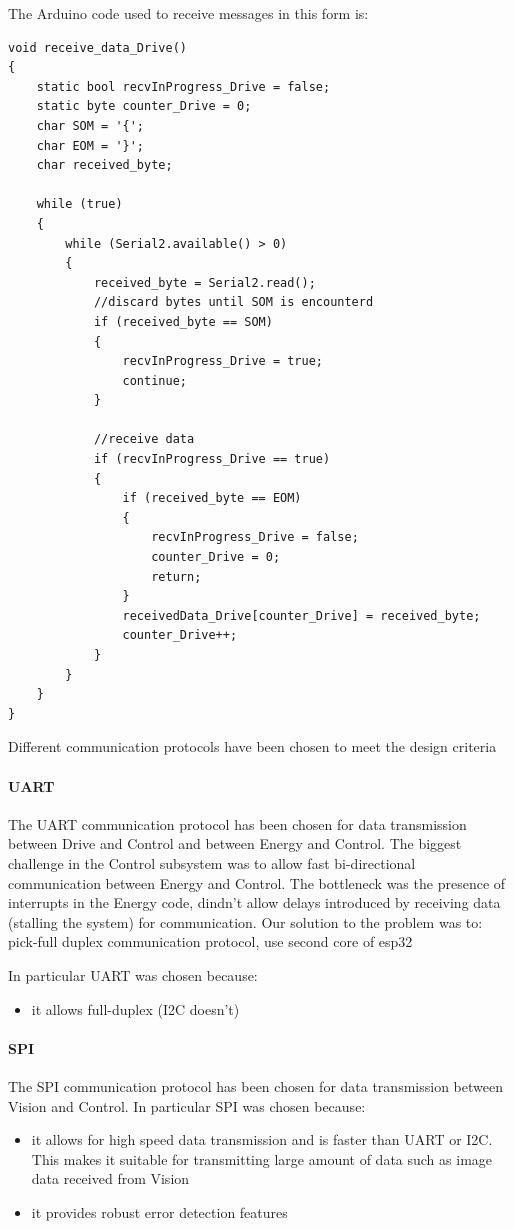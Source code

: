\documentclass[10pt,twoside]{article}
\begin{document}
The Arduino code used to receive messages in this form is:
\begin{verbatim}
void receive_data_Drive()
{
    static bool recvInProgress_Drive = false;
    static byte counter_Drive = 0;
    char SOM = '{';
    char EOM = '}';
    char received_byte;

    while (true)
    {
        while (Serial2.available() > 0)
        {
            received_byte = Serial2.read();
            //discard bytes until SOM is encounterd
            if (received_byte == SOM)
            {
                recvInProgress_Drive = true;
                continue;
            }

            //receive data
            if (recvInProgress_Drive == true)
            {
                if (received_byte == EOM)
                {
                    recvInProgress_Drive = false;
                    counter_Drive = 0;
                    return;
                }
                receivedData_Drive[counter_Drive] = received_byte;
                counter_Drive++;
            }
        }
    }
}

\end{verbatim}








Different communication protocols have been chosen to meet the design criteria

\paragraph{UART} The UART communication protocol has been chosen for data transmission between Drive and Control and between Energy and Control. 
The biggest challenge in the Control subsystem was to allow fast bi-directional communication between Energy and Control. The bottleneck was the presence of interrupts in the Energy code, dindn't allow delays introduced by receiving data (stalling the system) for communication.
Our solution to the problem was to: pick-full duplex communication protocol, use second core of esp32 

In particular UART was chosen because: 
\begin{itemize}
    \item it allows full-duplex (I2C doesn't)
\end{itemize}


\paragraph{SPI} The SPI communication protocol has been chosen for data transmission between Vision and Control.
In particular SPI was chosen because: 
\begin{itemize}
    \item it allows for high speed data transmission and is faster than UART or I2C. This makes it suitable for transmitting large amount of data such as image data received from Vision 
    \item it provides robust error detection features
\end{itemize}
\end{document}
